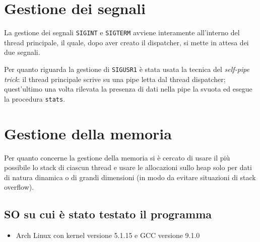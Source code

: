 \documentclass[a4paper,11pt]{article}
\begin{document}
\section{Gestione dei segnali}
La gestione dei segnali \texttt{SIGINT} e \texttt{SIGTERM} avviene interamente all'interno del thread principale, il quale, dopo aver creato il dispatcher, si mette in attesa dei due segnali.

Per quanto riguarda la gestione di \texttt{SIGUSR1} è stata usata la tecnica del \emph{self-pipe trick}: il thread principale scrive su una pipe letta dal thread dispatcher; quest'ultimo
una volta rilevata la presenza di dati nella pipe la svuota ed esegue la procedura \texttt{stats}.

\section{Gestione della memoria}
Per quanto concerne la gestione della memoria si è cercato di usare il più possibile lo stack di ciascun thread e usare le allocazioni sullo heap solo per dati
di natura dinamica o di grandi dimensioni (in modo da evitare situazioni di stack overflow).

\begin{appendices}
    \section{SO su cui è stato testato il programma}
\begin{itemize}
    \item Arch Linux con kernel versione 5.1.15 e GCC versione 9.1.0
\end{itemize}
\end{appendices}
\end{document}
